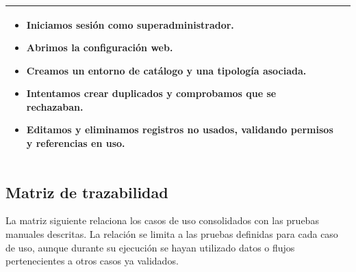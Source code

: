 {\begin{longtable}{|>{\raggedright\arraybackslash}p{4.1cm}|>{\raggedright\arraybackslash}p{10.2cm}|}
\begin{itemize}[leftmargin=1.2em,itemsep=0.15em,topsep=0.2em]
\item Iniciamos sesión como superadministrador.
\item Abrimos la configuración web.
\item Creamos un entorno de catálogo y una tipología asociada.
\item Intentamos crear duplicados y comprobamos que se rechazaban.
\item Editamos y eliminamos registros no usados, validando permisos y referencias en uso.
\end{itemize}
\\ \hline
\end{longtable}
}
\renewcommand{\arraystretch}{1}

\subsection{Matriz de trazabilidad}

La matriz siguiente relaciona los casos de uso consolidados con las pruebas
manuales descritas. La relación se limita a las pruebas definidas para cada
caso de uso, aunque durante su ejecución se hayan utilizado datos o flujos
pertenecientes a otros casos ya validados.


